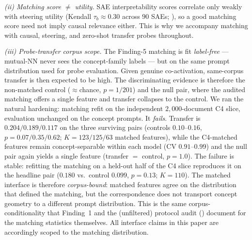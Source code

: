 \emph{(ii) Matching score $\neq$ utility.} SAE interpretability scores correlate only weakly
with steering utility (Kendall $\tau_b\approx0.30$ across $90$ SAEs;
\citealp{wang2025interputility}), so a good matching score need not imply causal relevance
either. This is
why we accompany matching with causal, steering, and zero-shot transfer probes throughout.

\emph{(iii) Probe-transfer corpus scope.} The Finding-5 matching is fit \emph{label-free}
--- mutual-NN never sees the concept-family labels --- but on the same prompt distribution
used for probe evaluation. Given genuine co-activation, same-corpus transfer is then
expected to be high. The discriminating evidence is therefore the non-matched control
($\approx$chance, $p=1/201$) and the null pair, where the audited matching offers a single
feature and transfer collapses to the control. We ran the natural hardening: matching refit
on the independent $2{,}000$-document C4 slice, evaluation unchanged on the concept prompts.
It \emph{fails}. Transfer is $0.204/0.189/0.117$ on the three surviving pairs (controls
$0.10$--$0.16$, $p=0.07/0.35/0.62$; $K=123/125/63$ matched features), while the C4-matched
features remain concept-separable within each model (CV $0.91$--$0.99$) and the null pair
again yields a single feature (transfer $=$ control, $p=1.0$). The failure is stable:
refitting the matching on a held-out half of the C4 slice reproduces it on the headline
pair ($0.180$ vs.\ control $0.099$, $p=0.13$; $K=110$). The matched interface is
therefore \emph{corpus-bound}: matched features agree on the distribution that defined the
matching, but the correspondence does not transport concept geometry to a different prompt
distribution. This is the same corpus-conditionality that Finding~1 and the (unfiltered) protocol audit
() document for the matching statistics themselves. All interface claims in
this paper are accordingly scoped to the matching distribution.

